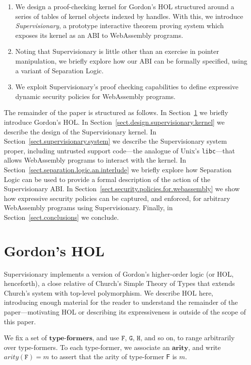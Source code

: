 \documentclass[a4paper, 10pt]{article}
\newcommand{\deffont}[1]{\ensuremath{\textbf{#1}}}
\begin{document}
\begin{enumerate}
\item
We design a proof-checking kernel for Gordon's HOL structured around a series of tables of kernel objects indexed by handles.
With this, we introduce \emph{Supervisionary}, a prototype interactive theorem proving system which exposes its kernel as an ABI to WebAssembly programs.
\item
Noting that Supervisionary is little other than an exercise in pointer manipulation, we briefly explore how our ABI can be formally specified, using a variant of Separation Logic.
\item
We exploit Supervisionary's proof checking capabilities to define expressive dynamic security policies for WebAssembly programs.
\end{enumerate}

The remainder of the paper is structured as follows.
In Section~\ref{sect.gordons.hol} we briefly introduce Gordon's HOL.
In Section~\ref{sect.design.supervisionary.kernel} we describe the design of the Supervisionary kernel.
In Section~\ref{sect.supervisionary.system} we describe the Supervisionary system proper, including untrusted support code---the analogue of Unix's \texttt{libc}---that allows WebAssembly programs to interact with the kernel.
In Section~\ref{sect.separation.logic.an.interlude} we briefly explore how Separation Logic can be used to provide a formal description of the action of the Supervisionary ABI.
In Section~\ref{sect.security.policies.for.webassembly} we show how expressive security policies can be captured, and enforced, for arbitrary WebAssembly programs using Supervisionary.
Finally, in Section~\ref{sect.conclusions} we conclude.

\section{Gordon's HOL}
\label{sect.gordons.hol}

Supervisionary implements a version of Gordon's higher-order logic (or HOL, henceforth), a close relative of Church's Simple Theory of Types that extends Church's system with top-level polymorphism.
We describe HOL here, introducing enough material for the reader to understand the remainder of the paper---motivating HOL or describing its expressiveness is outside of the scope of this paper.

We fix a set of \deffont{type-formers}, and use $\mathtt{F}$, $\mathtt{G}$, $\mathtt{H}$, and so on, to range arbitrarily over type-formers.
To each type-former, we associate an \deffont{arity}, and write $arity(\mathtt{F}) = m$ to assert that the arity of type-former $\mathsf{F}$ is $m$.
\end{document}
